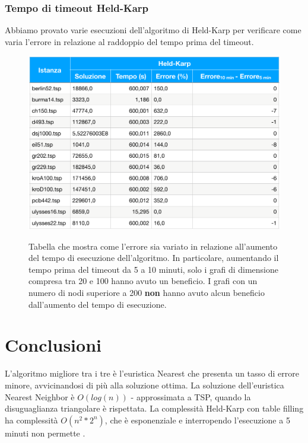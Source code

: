 \documentclass[a4paper]{article}
\begin{document}
\subsubsection{Tempo di timeout Held-Karp}
Abbiamo provato varie esecuzioni dell'algoritmo di Held-Karp per verificare come varia l'errore in relazione al raddoppio del tempo prima del timeout.
\begin{figure}[H]
	\centering
	\includegraphics[width=0.5\linewidth]{differenze_errori}
	\label{fig:timeouttiming}
	\caption{Tabella che mostra come l'errore sia variato in relazione all'aumento del tempo di esecuzione dell'algoritmo. In particolare, aumentando il tempo prima del timeout da 5 a 10 minuti, solo i grafi di dimensione compresa tra 20 e 100 hanno avuto un beneficio. I grafi con un numero di nodi superiore a 200 \textbf{non} hanno avuto alcun beneficio dall'aumento del tempo di esecuzione.}
\end{figure}

\section{Conclusioni}
L'algoritmo migliore tra i tre è l'euristica Nearest che presenta un tasso di errore minore, avvicinandosi di più alla soluzione ottima. La soluzione dell'euristica Nearest Neighbor è $O(log(n))$ - approssimata a TSP, quando la disuguaglianza triangolare è rispettata. La complessità Held-Karp con table filling ha complessità $O(n^2*2^n)$, che è esponenziale e interropendo l'esecuzione a 5 minuti non permette .
\end{document}
